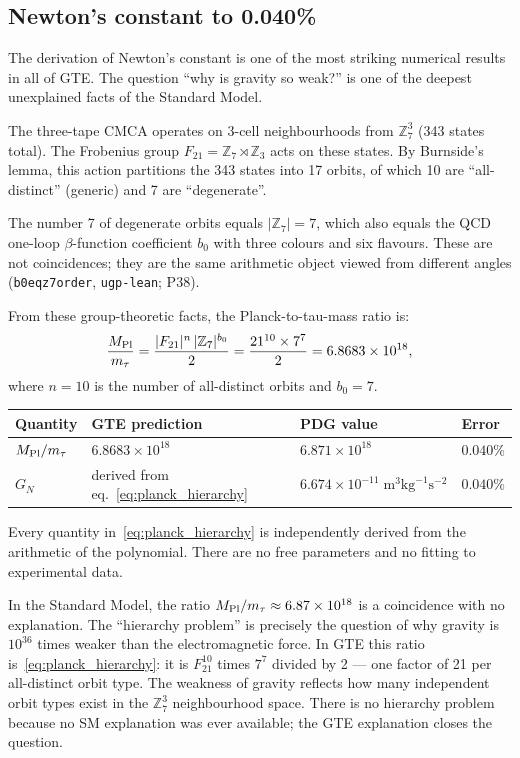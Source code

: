 \documentclass[11pt,a4paper]{article}
\newcommand{\lean}[1]{\begingroup\def\_{\textunderscore\allowbreak}\texttt{#1}\endgroup}
\newcommand{\GN}{G_{\!N}}
\newcommand{\MPl}{M_{\rm Pl}}
\newcommand{\mtau}{m_\tau}
\newcommand{\ZS}{\mathbb{Z}_7}
\begin{document}
\subsection{Newton's constant to 0.040\%}

The derivation of Newton's constant is one of the most striking numerical results
in all of GTE.  The question ``why is gravity so weak?'' is one of the deepest
unexplained facts of the Standard Model.

The three-tape CMCA operates on 3-cell neighbourhoods from $\ZS^3$ (343 states total).
The Frobenius group $F_{21} = \ZS \rtimes \mathbb{Z}_3$ acts on these states.
By Burnside's lemma, this action partitions the 343 states into 17 orbits, of which
10 are ``all-distinct'' (generic) and 7 are ``degenerate''.

The number 7 of degenerate orbits equals $|\ZS| = 7$, which also equals the
QCD one-loop $\beta$-function coefficient $b_0$ with three colours and six flavours.
These are not coincidences; they are the same arithmetic object viewed from different
angles (\lean{b0\_eq\_z7\_order}, \texttt{ugp-lean}; P38).

From these group-theoretic facts, the Planck-to-tau-mass ratio is:
\begin{equation}
  \frac{\MPl}{\mtau}
  = \frac{|F_{21}|^n\,|\ZS|^{b_0}}{2}
  = \frac{21^{10}\times 7^7}{2}
  = 6.8683\times10^{18},
  \label{eq:planck_hierarchy}
\end{equation}
where $n = 10$ is the number of all-distinct orbits and $b_0 = 7$.

\begin{center}
\renewcommand{\arraystretch}{1.3}
\begin{tabular}{llll}
\toprule
Quantity & GTE prediction & PDG value & Error \\
\midrule
$\MPl / \mtau$ & $6.8683\times10^{18}$ & $6.871\times10^{18}$ & $0.040\%$ \\
$\GN$ & derived from eq.~\eqref{eq:planck_hierarchy} & $6.674\times10^{-11}\;\text{m}^3\text{kg}^{-1}\text{s}^{-2}$ & $0.040\%$ \\
\bottomrule
\end{tabular}
\end{center}

Every quantity in~\eqref{eq:planck_hierarchy} is independently derived from the
arithmetic of the polynomial.  There are no free parameters and no fitting to
experimental data.

\begin{tcolorbox}[colback=boxgray,colframe=gray!50!black,title=What the 0.040\% means]
In the Standard Model, the ratio $\MPl/\mtau \approx 6.87\times10^{18}$ is a
coincidence with no explanation.  The ``hierarchy problem'' is precisely the
question of why gravity is $10^{36}$ times weaker than the electromagnetic force.
In GTE this ratio is~\eqref{eq:planck_hierarchy}: it is $F_{21}^{10}$ times $7^7$
divided by 2 --- one factor of 21 per all-distinct orbit type.  The weakness of
gravity reflects how many independent orbit types exist in the
$\mathbb{Z}_7^3$ neighbourhood space.  There is no hierarchy problem because
no SM explanation was ever available; the GTE explanation closes the question.
\end{tcolorbox}
\end{document}
